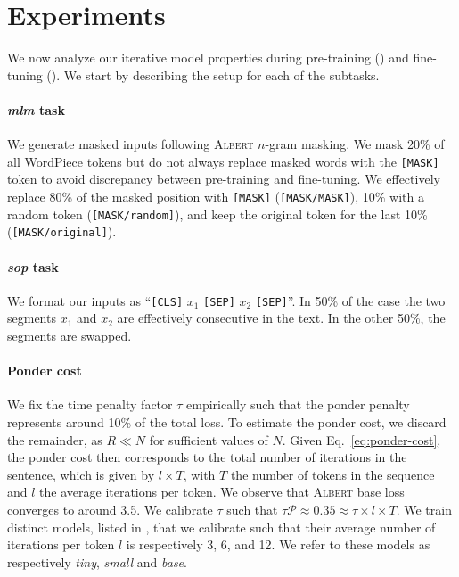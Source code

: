 \section{Experiments}

We now analyze our iterative model properties during pre-training () and fine-tuning (). We start by describing the setup for each of the subtasks.


\paragraph{\textit{mlm} task} We generate masked inputs following \textsc{Albert} $n$-gram masking. We mask 20\% of all WordPiece tokens but do not always replace masked words with the \texttt{[MASK]} token to avoid discrepancy between pre-training and fine-tuning. We effectively replace 80\% of the masked position with \texttt{[MASK]} (\texttt{[MASK/MASK]}), 10\% with a random token (\texttt{[MASK/random]}), and keep the original token for the last 10\% (\texttt{[MASK/original]}).

\paragraph{\textit{sop} task}  We format our inputs as ``\texttt{[CLS]} $x_1$ \texttt{[SEP]} $x_2$ \texttt{[SEP]}''. In 50\% of the case the two segments $x_1$ and $x_2$ are effectively consecutive in the text. In the other 50\%, the segments are swapped. 

\paragraph{Ponder cost} We fix the time penalty factor $\tau$ empirically such that the ponder penalty represents around 10\% of the total loss. To estimate the ponder cost, we discard the remainder, as $R \ll N$ for sufficient values of $N$. Given Eq.~\ref{eq:ponder-cost}, the ponder cost then corresponds to the total number of iterations in the sentence, which is given by $l \times T$, with $T$ the number of tokens in the sequence and $l$ the average iterations per token. We observe that \textsc{Albert} base loss converges to around 3.5. We calibrate $\tau$ such that  $\tau\mathcal{P} \approx 0.35 \approx \tau \times l \times T$. We train distinct models, listed in , that we calibrate such that their average number of iterations per token $l$ is respectively 3, 6, and 12. We refer to these models as respectively \textit{tiny}, \textit{small} and \textit{base}. 

